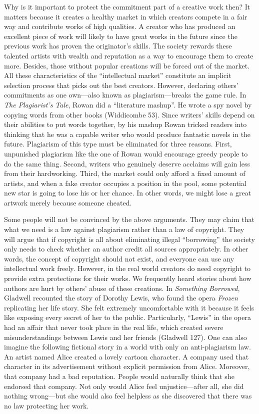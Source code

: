 Why is it important to protect the commitment part of a creative work
then? It matters because it creates a healthy market in which creators
compete in a fair way and contribute works of high qualities. A creator
who has produced an excellent piece of work will likely to have great
works in the future since the previous work has proven the originator's
skills. The society rewards these talented artists with wealth and
reputation as a way to encourage them to create more. Besides, those
without popular creations will be forced out of the market. All these
characteristics of the ``intellectual market'' constitute an implicit
selection process that picks out the best creators. However, declaring
others' commitments as one own---also known as plagiarism---breaks the
game rule. In \emph{The Plagiarist's Tale}, Rowan did a ``literature
mashup''. He wrote a spy novel by copying words from other books
(Widdicombe 53). Since writers' skills depend on their abilities to put
words together, by his mashup Rowan tricked readers into thinking that
he was a capable writer who would produce fantastic novels in the
future. Plagiarism of this type must be eliminated for three reasons.
First, unpunished plagiarism like the one of Rowan would encourage
greedy people to do the same thing. Second, writers who genuinely
deserve acclaims will gain less from their hardworking. Third, the
market could only afford a fixed amount of artists, and when a fake
creator occupies a position in the pool, some potential new star is
going to lose his or her chance. In other words, we might lose a great
artwork merely because someone cheated.

Some people will not be convinced by the above arguments. They may claim
that what we need is a law against plagiarism rather than a law of
copyright. They will argue that if copyright is all about eliminating
illegal ``borrowing'' the society only needs to check whether an author
credit all sources appropriately. In other words, the concept of
copyright should not exist, and everyone can use any intellectual work
freely. However, in the real world creators do need copyright to provide
extra protections for their works. We frequently heard stories about how
authors are hurt by others' abuse of these creations. In \emph{Something
Borrowed}, Gladwell recounted the story of Dorothy Lewis, who found the
opera \emph{Frozen} replicating her life story. She felt extremely
uncomfortable with it because it feels like exposing every secret of her
to the public. Particularly, ``Lewis'' in the opera had an affair that
never took place in the real life, which created severe
misunderstandings between Lewis and her friends (Gladwell 127). One can
also imagine the following fictional story in a world with only an
anti-plagiarism law. An artist named Alice created a lovely cartoon
character. A company used that character in its advertisement without
explicit permission from Alice. Moreover, that company had a bad
reputation. People would naturally think that she endorsed that company.
Not only would Alice feel unjustice---after all, she did nothing
wrong---but she would also feel helpless as she discovered that there
was no law protecting her work.

